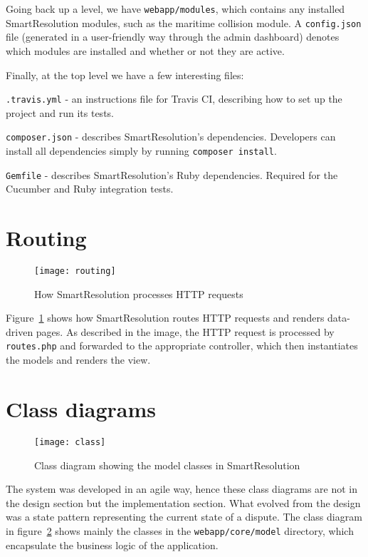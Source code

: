 Going back up a level, we have \lstinline{webapp/modules}, which contains any installed SmartResolution modules, such as the maritime collision module. A \lstinline{config.json} file (generated in a user-friendly way through the admin dashboard) denotes which modules are installed and whether or not they are active.

Finally, at the top level we have a few interesting files:

\lstinline{.travis.yml} - an instructions file for Travis CI, describing how to set up the project and run its tests.

\lstinline{composer.json} - describes SmartResolution's dependencies. Developers can install all dependencies simply by running \lstinline{composer install}.

\lstinline{Gemfile} - describes SmartResolution's Ruby dependencies. Required for the Cucumber and Ruby integration tests.

\section{Routing}

\begin{figure}[h!]
  \centering
    \ifimages
    \texttt{[image: routing]}
    \fi
  \caption{How SmartResolution processes HTTP requests}
  \label{uml:routing}
\end{figure}

Figure~\ref{uml:routing} shows how SmartResolution routes HTTP requests and renders data-driven pages. As described in the image, the HTTP request is processed by \lstinline{routes.php} and forwarded to the appropriate controller, which then instantiates the models and renders the view.

\section{Class diagrams}

\begin{figure}[h!]
  \centering
    \ifimages
    \texttt{[image: class]}
    \fi
  \caption{Class diagram showing the model classes in SmartResolution}
  \label{uml:class}
\end{figure}

The system was developed in an agile way, hence these class diagrams are not in the design section but the implementation section. What evolved from the design was a state pattern representing the current state of a dispute. The class diagram in figure~\ref{uml:class} shows mainly the classes in the \lstinline{webapp/core/model} directory, which encapsulate the business logic of the application.

